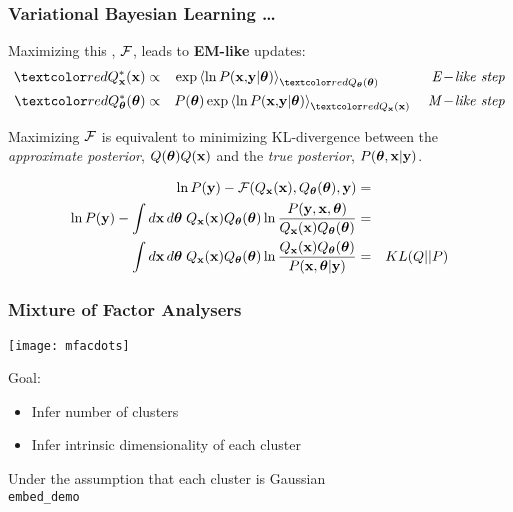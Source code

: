 \begin{frame}
\frametitle{Variational Bayesian Learning \ldots}

Maximizing this , $\mathcal{F}$, leads to {\bf EM-like} updates:
\begin{eqnarray*}
  \Red{Q_\bx^*(\bx)} &\propto& \exp \left \langle \ln P(\bx,\!\by|\btheta) \right \rangle_{\Red{Q_{\btheta}(\btheta)}} \hspace{36pt} {\it E\!-\!like \ step} \nn \\
  \Red{Q_{\btheta}^*(\btheta)} &\propto& P(\btheta) \exp \left \langle \ln P(\bx,\!\by|\btheta) \right \rangle_{\Red{Q_\bx(\bx)}} \hspace{11pt} {\it M\!-\!like \ step} \nn
\end{eqnarray*}

Maximizing $\mathcal{F}$ is equivalent to minimizing KL-divergence between the
{\em approximate posterior}, $Q(\boldsymbol{\theta})Q(\mathbf{x})$ and the {\em true posterior}, 
$P(\boldsymbol{\theta},\mathbf{x}|\mathbf{y})$.

\begin{eqnarray*}
\ln P(\mathbf{y}) - \mathcal{F}(Q_{\mathbf{x}}(\mathbf{x}),Q_{\boldsymbol{\theta}}(\boldsymbol{\theta}),\mathbf{y}) &=& \\
\ln P(\mathbf{y}) - \int d\mathbf{x} \, d\boldsymbol{\theta} \; Q_{\mathbf{x}}(\mathbf{x})
Q_{\boldsymbol{\theta}}(\boldsymbol{\theta})  \ln \frac{P(\mathbf{y},\mathbf{x},\boldsymbol{\theta})}{ Q_{\mathbf{x}}(\mathbf{x})
Q_{\boldsymbol{\theta}}(\boldsymbol{\theta})  } &=&  \\ 
\int d\mathbf{x} \, d\boldsymbol{\theta} \; Q_{\mathbf{x}}(\mathbf{x})
Q_{\boldsymbol{\theta}}(\boldsymbol{\theta})  \ln \frac{ Q_{\mathbf{x}}(\mathbf{x})
Q_{\boldsymbol{\theta}}(\boldsymbol{\theta})  }{P(\mathbf{x},\boldsymbol{\theta}|\mathbf{y})} &=&  KL(Q||P)
\end{eqnarray*}
\end{frame}
\begin{frame}
\frametitle{Mixture of Factor Analysers}

\centerline{
\texttt{[image: mfacdots]}}

\vspace*{-2.5em}
Goal:
\begin{itemize}
\item Infer number of clusters
\item Infer intrinsic dimensionality of each cluster
\end{itemize}
Under the assumption that each cluster is Gaussian \\

{\tt embed\_demo}

\end{frame}
